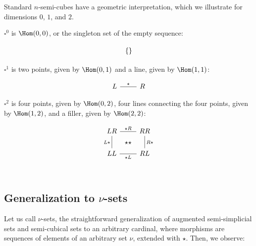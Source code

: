 \documentclass[10pt]{art.cls/art}
\newcommand{\Cube}{\ensuremath{\boldsymbol{\square}}}
\newcommand{\kstar}{{\star}}
\begin{document}
Standard $n$-semi-cubes have a geometric interpretation, which we illustrate for dimensions $0$, $1$, and $2$.

\begin{example}[$\Cube^0$]
  $\Cube^0$ is $\Hom(0, 0)$, or the singleton set of the empty sequence:

  \begin{equation*}
    \begin{tikzcd}
      \{\}
    \end{tikzcd}
  \end{equation*}
\end{example}

\begin{example}[$\Cube^1$]
  $\Cube^1$ is two points, given by $\Hom(0, 1)$ and a line, given by $\Hom(1, 1)$:

  \begin{equation*}
    \begin{tikzcd}
      L \arrow[r, "\kstar", dash] & R
    \end{tikzcd}
  \end{equation*}
\end{example}

\begin{example}[$\Cube^2$]
  $\Cube^2$ is four points, given by $\Hom(0, 2)$, four lines connecting the four points, given by $\Hom(1, 2)$, and a filler, given by $\Hom(2, 2)$:

  \begin{equation*}
    \begin{tikzcd}
      LR \arrow[r, dash, "\kstar R"{name=F}] \arrow[d, dash, "L\kstar" left] & RR \arrow[d, dash, "R\kstar"] \\
      LL \arrow[r, dash, "\kstar L"{name=T, below}] & RL \\
      \arrow[rightarrow, from=F, to=T, phantom, "\kstar\kstar" description]
    \end{tikzcd}
  \end{equation*}
\end{example}

\subsection{Generalization to \texorpdfstring{$\nu$}{ν}-sets}
Let us call $\nu$-sets, the straightforward generalization of augmented semi-simplicial sets and semi-cubical sets to an arbitrary cardinal, where morphisms are sequences of elements of an arbitrary set $\nu$, extended with $\kstar$. Then, we observe:
\end{document}
